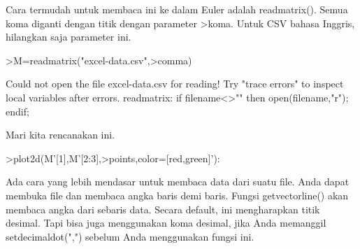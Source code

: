 \documentclass[a4paper,10pt]{article}
\begin{document}
\begin{eulernotebook}
\begin{eulercomment}
\begin{eulercomment}
\begin{eulercomment}
Cara termudah untuk membaca ini ke dalam Euler adalah readmatrix().
Semua koma diganti dengan titik dengan parameter \textgreater{}koma. Untuk CSV
bahasa Inggris, hilangkan saja parameter ini.
\end{eulercomment}
\begin{eulerprompt}
>M=readmatrix("excel-data.csv",>comma)
\end{eulerprompt}
\begin{euleroutput}
  Could not open the file
  excel-data.csv
  for reading!
  Try "trace errors" to inspect local variables after errors.
  readmatrix:
      if filename<>"" then open(filename,"r"); endif;
\end{euleroutput}
\begin{eulercomment}
Mari kita rencanakan ini.
\end{eulercomment}
\begin{eulerprompt}
>plot2d(M'[1],M'[2:3],>points,color=[red,green]'):
\end{eulerprompt}
\begin{eulercomment}
Ada cara yang lebih mendasar untuk membaca data dari suatu file. Anda
dapat membuka file dan membaca angka baris demi baris. Fungsi
getvectorline() akan membaca angka dari sebaris data. Secara default,
ini mengharapkan titik desimal. Tapi bisa juga menggunakan koma
desimal, jika Anda memanggil setdecimaldot(",") sebelum Anda
menggunakan fungsi ini.


\end{eulercomment}
\end{eulercomment}
\end{eulercomment}
\end{eulernotebook}
\end{document}
